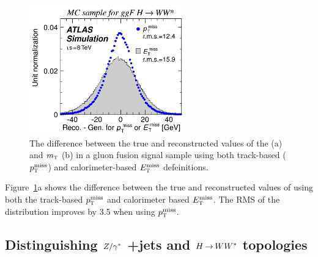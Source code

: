 \begin{figure}[h!]
  \centering
  \captionsetup{justification=centering}

  \includegraphics[width=0.6\textwidth]{figures/METResolution2}
  \caption{The difference between the true and reconstructed values of the \met (a) and $m_{\textrm{\footnotesize\sc t}}$ (b) in a gluon fusion signal sample using both track-based ($p_{\textrm{\footnotesize\sc t}}^{\rm miss}$) and calorimeter-based $E_{\textrm{\footnotesize\sc t}}^{\rm miss}$ defeinitions.}
  \label{fig:METResolution2}
\end{figure}
%
Figure~\ref{fig:METResolution2}a shows the difference between the true and reconstructed values of \met using both the track-based $p_{\textrm{\footnotesize\sc t}}^{\rm miss}$ and calorimeter based $E_{\textrm{\footnotesize\sc t}}^{\rm miss}$. The RMS of the distribution improves by 3.5 \GeV when using $p_{\textrm{\footnotesize\sc t}}^{\rm miss}$.

\subsection{Distinguishing $Z/\gamma^{\ast}$ +jets and $H{\,{\rightarrow}\,}WW^\ast$ topologies}

